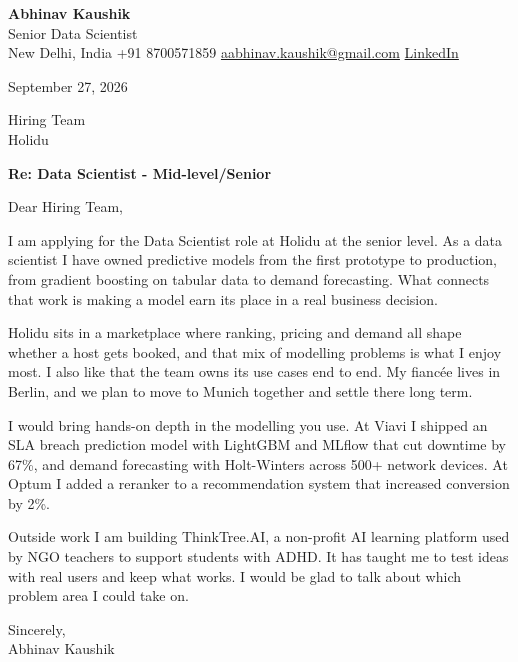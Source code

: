 \documentclass[11pt,a4paper]{article}
\begin{document}
{\Large\bfseries Abhinav Kaushik}\\
Senior Data Scientist\\
New Delhi, India \textbar{} +91 8700571859 \textbar{} \href{mailto:aabhinav.kaushik@gmail.com}{aabhinav.kaushik@gmail.com} \textbar{} \href{https://www.linkedin.com/in/abhinav-kaushik10/}{LinkedIn}  

September 27, 2026

Hiring Team\\
Holidu

\textbf{Re: Data Scientist - Mid-level/Senior}

Dear Hiring Team,

I am applying for the Data Scientist role at Holidu at the senior level. As a data scientist I have owned predictive models from the first prototype to production, from gradient boosting on tabular data to demand forecasting. What connects that work is making a model earn its place in a real business decision.

Holidu sits in a marketplace where ranking, pricing and demand all shape whether a host gets booked, and that mix of modelling problems is what I enjoy most. I also like that the team owns its use cases end to end. My fiancée lives in Berlin, and we plan to move to Munich together and settle there long term.

I would bring hands-on depth in the modelling you use. At Viavi I shipped an SLA breach prediction model with LightGBM and MLflow that cut downtime by 67\%, and demand forecasting with Holt-Winters across 500+ network devices. At Optum I added a reranker to a recommendation system that increased conversion by 2\%.

Outside work I am building ThinkTree.AI, a non-profit AI learning platform used by NGO teachers to support students with ADHD. It has taught me to test ideas with real users and keep what works. I would be glad to talk about which problem area I could take on.

Sincerely,\\[4pt]
Abhinav Kaushik
\end{document}
